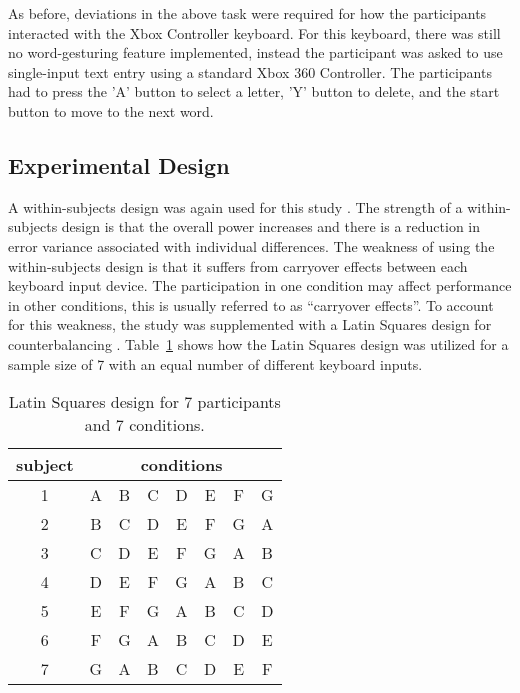 As before, deviations in the above task were required for how the participants interacted with the Xbox Controller keyboard. For this keyboard, there was still no word-gesturing feature implemented, instead the participant was asked to use single-input text entry using a standard Xbox 360 Controller. The participants had to press the 'A' button to select a letter, 'Y' button to delete, and the start button to move to the next word.

\subsection{Experimental Design} \label{pilot_experimental_design}
A within-subjects design was again used for this study \cite{ref_within_subjects}. The strength of a within-subjects design is that the overall power increases and there is a reduction in error variance associated with individual differences. The weakness of using the within-subjects design is that it suffers from carryover effects between each keyboard input device. The participation in one condition may affect performance in other conditions, this is usually referred to as ``carryover effects''. To account for this weakness, the study was supplemented with a Latin Squares design for counterbalancing \cite{ref_latin_squares}. Table~\ref{pilot_latin_squares} shows how the Latin Squares design was utilized for a sample size of 7 with an equal number of different keyboard inputs.
			
\begin{table}[h] %
	\centering
	\caption[Latin Squares Example]{\centering Latin Squares design for 7 participants and 7 conditions.}
	\label{pilot_latin_squares}
	\begin{tabular}{c | c c c c c c c}
		\hline
		subject & \multicolumn{7}{c}{conditions} \\
		\hline
		1 & A & B & C & D & E & F & G \\
		2 & B & C & D & E & F & G & A \\
		3 & C & D & E & F & G & A & B \\
		4 & D & E & F & G & A & B & C \\
		5 & E & F & G & A & B & C & D \\
		6 & F & G & A & B & C & D & E \\
		7 & G & A & B & C & D & E & F \\
		\hline
	\end{tabular}
\end{table}


